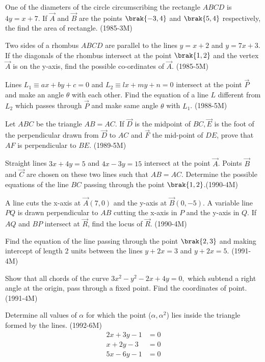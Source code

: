 \item One of the diameters of the circle circumscribing the rectangle $ABCD$ is $4y=x+ 7$. If $\vec{A}$ and $\vec{B}$ are the points $\brak{-3,4}$ and $\brak{5,4}$ respectively, the find the area of rectangle.  \hfill{(1985-3M)}


\item Two sides of a rhombus $ABCD$ are parallel to the lines $y=x+2$ and $y=7x+3$. If the diagonals of the rhombus intersect at the point $\brak{1,2}$ and the vertex $\vec{A}$ is on the y-axis, find the possible co-ordinates of $\vec{A}$.     \hfill{(1985-5M)} 

\item Lines $ L_1 \equiv ax+by+c =0 $ and $ L_2 \equiv lx+my+n =0 $ intersect at the point $\vec{P}$ and make an angle $\theta$ with each other. Find the equation of a line $L$ different from $L_2$ which passes through $\vec{P}$ and make same angle $\theta$ with $L_1$. \hfill{(1988-5M)}


\item Let $ABC$ be the triangle $AB=AC$. If $\vec{D}$ is the midpoint of $ BC, \vec{E}$ is the foot of the perpendicular drawn from $\vec{D}$ to $AC$ and $\vec{F}$ the mid-point of $DE$, prove that $AF$ is perpendicular to $BE.$ \hfill{(1989-5M)}

\item Straight lines $3x + 4y =5$ and $ 4x-3y= 15$ intersect at the point $\vec{A}$. Points $\vec{B}$ and $\vec{C}$ are chosen on these two lines such that $AB=AC$. Determine the possible equations of the line $BC$ passing through the point $\brak{1,2}$.\hfill{(1990-4M)}

\item A line cuts the x-axis at $\vec{A}(7,0)$ and the y-axis at $\vec{B}(0,-5)$. A variable line $PQ$ is drawn perpendicular to $AB$ cutting the x-axis in $P$ and the y-axis in $Q$. If $AQ$ and $BP$ intersect at $\vec{R}$, find the locus of $\vec{R}$.  \hfill{(1990-4M)}

\item Find the equation of the line passing through the point $\brak{2,3}$ and making intercept of length 2 units between the lines $ y + 2x = 3 $ and $ y + 2x = 5  $.     \hfill{(1991-4M)}
     \begin{center}
          
	\end{center}

\item Show that all chords of  the curve $ 3x^2-y^2-2x+4y=0,$ which subtend a right angle at the origin, pass through a fixed point. Find the coordinates of point.     \hfill{(1991-4M)}

\item Determine all values of $\alpha$ for which the point ($\alpha , \alpha^2$) lies inside the triangle formed by the lines.  \hfill{(1992-6M)}
	\begin{align*}  2x+3y-1&=0\\ 
	x+2y-3&=0  \\ 5x-6y-1&=0   \end{align*}




